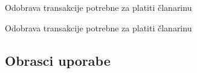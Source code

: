 \begin{packed_enum}
				\begin{packed_enum}

				\item Odobrava transakcije potrebne za platiti članarinu

				\end{packed_enum}				
				
				\item  {}				
				
				\begin{packed_enum}
						
				\item Odobrava transakcije potrebne za platiti članarinu 					
					
				\end{packed_enum}
			    
			   
					

												
			\end{packed_enum}
			
	
			\eject 
			
			
				
			\subsection{Obrasci uporabe}
							
